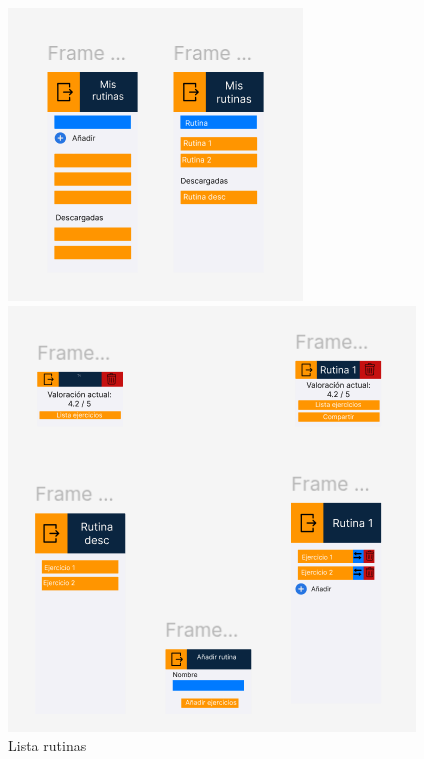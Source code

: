 \begin{figure}[H]
	\begin{minipage}[b]{0.4\textwidth}
    \centering
    \includegraphics[width=\textwidth]{fotos/ListaRutinas.png}
    \caption{Lista rutinas}
    \label{fig:Lista rutinas}
  \end{minipage}
  \begin{minipage}[b]{0.4\textwidth}
    \centering
    \includegraphics[width=\textwidth]{fotos/DatosRutinas.png}

\end{minipage}
\end{figure}
